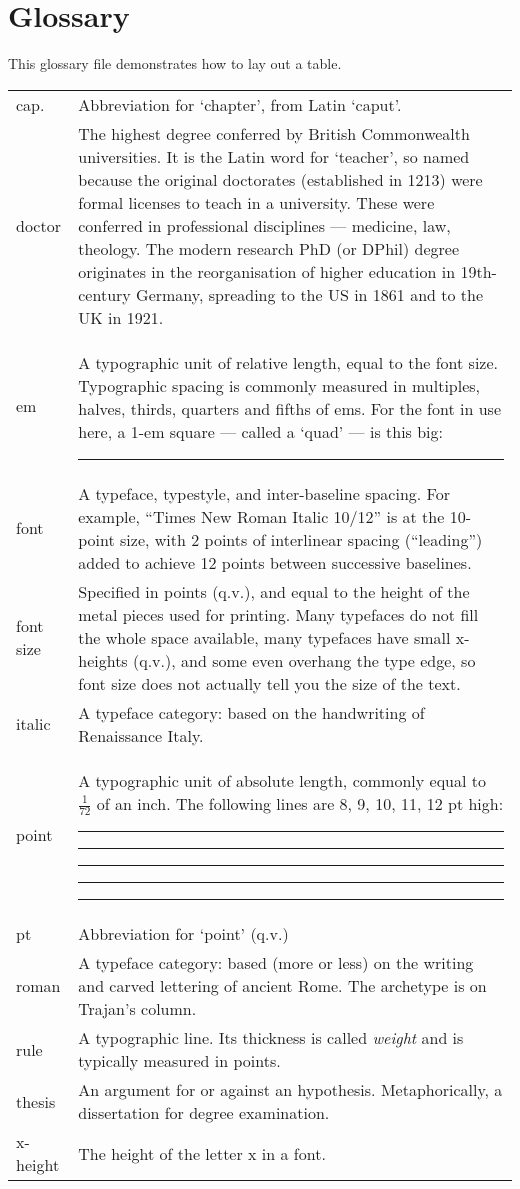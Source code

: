 \chapter*{Glossary}
%
%


This glossary file demonstrates how to lay out a table.

\medskip

\noindent
\begin{tabularx}{\textwidth}{@{}lX}
cap. & Abbreviation for `chapter', from Latin `caput'. \\
doctor & The highest degree conferred by British Commonwealth universities. It is the Latin word for `teacher', so named because the original doctorates (established in 1213) were formal licenses to teach
in a university. These were conferred in professional disciplines — medicine, law, theology. The modern research PhD (or DPhil) degree originates in the reorganisation of higher education in 19th-century Germany, spreading to the US in 1861 and to the UK in 1921. \\
em & A typographic unit of relative length, equal to the font size. Typographic spacing is commonly measured in multiples, halves, thirds, quarters and fifths of ems. For the font in use here, a 1-em square — called a `quad' — is this big: \rule{1em}{1em} \\
font & A typeface, typestyle, and inter-baseline spacing. For example, ``Times New Roman Italic 10/12'' is at the 10-point size, with 2 points of interlinear spacing (``leading'') added to achieve 12 points between successive baselines. \\
font size & Specified in points (q.v.), and equal to the height of the metal pieces used for printing. Many typefaces do not fill the whole space available, many typefaces have small x-heights (q.v.), and some even overhang the type edge, so font size does not actually tell you the size of the text. \\
italic & A typeface category: based on the handwriting of Renaissance Italy. \\
point & A typographic unit of absolute length, commonly equal to $\frac{1}{72}$ of an inch. The following lines are 8, 9, 10, 11, 12 pt high: \rule{1pt}{8pt} \rule{1pt}{9pt}  \rule{1pt}{10pt} \rule{1pt}{11pt} \rule{1pt}{12pt} \\
pt & Abbreviation for `point' (q.v.) \\
roman & A typeface category: based (more or less) on the writing and carved lettering of ancient Rome. The archetype is on Trajan's column. \\ 
rule & A typographic line. Its thickness is called \emph{weight} and is typically measured in points. \\
thesis & An argument for or against an hypothesis. Metaphorically, a dissertation for degree examination. \\
x-height & The height of the letter x in a font. \\
\end{tabularx}